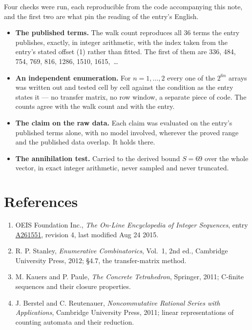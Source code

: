 \documentclass[11pt]{article}
\theoremstyle{definition}
\begin{document}
Four checks were run, each reproducible from the code accompanying this note, and the first two are what pin the reading of the entry's English.

\begin{itemize}

\item {\bfseries The published terms.} The walk count reproduces all 36 terms the entry publishes, exactly, in integer arithmetic, with the index taken from the entry's stated offset (1) rather than fitted. The first of them are 336, 484, 754, 769, 816, 1286, 1510, 1615,~\dots

\item {\bfseries An independent enumeration.} For $n = 1,\dots,2$ every one of the $2^{6n}$ arrays was written out and tested cell by cell against the condition as the entry states it --- no transfer matrix, no row window, a separate piece of code. The counts agree with the walk count and with the entry.

\item {\bfseries The claim on the raw data.} Each claim was evaluated on the entry's published terms alone, with no model involved, wherever the proved range and the published data overlap. It holds there.

\item {\bfseries The annihilation test.} Carried to the derived bound $S = 69$ over the whole vector, in exact integer arithmetic, never sampled and never truncated.

\end{itemize}

\section{References}

\begin{enumerate}

\item OEIS Foundation Inc., \emph{The On-Line Encyclopedia of Integer Sequences}, entry \href{https://oeis.org/A261551}{A261551}, revision 4, last modified Aug 24 2015.

\item R. P. Stanley, \emph{Enumerative Combinatorics}, Vol.~1, 2nd ed., Cambridge University Press, 2012; \S4.7, the transfer-matrix method.

\item M. Kauers and P. Paule, \emph{The Concrete Tetrahedron}, Springer, 2011; C-finite sequences and their closure properties.

\item J. Berstel and C. Reutenauer, \emph{Noncommutative Rational Series with Applications}, Cambridge University Press, 2011; linear representations of counting automata and their reduction.

\end{enumerate}
\end{document}
